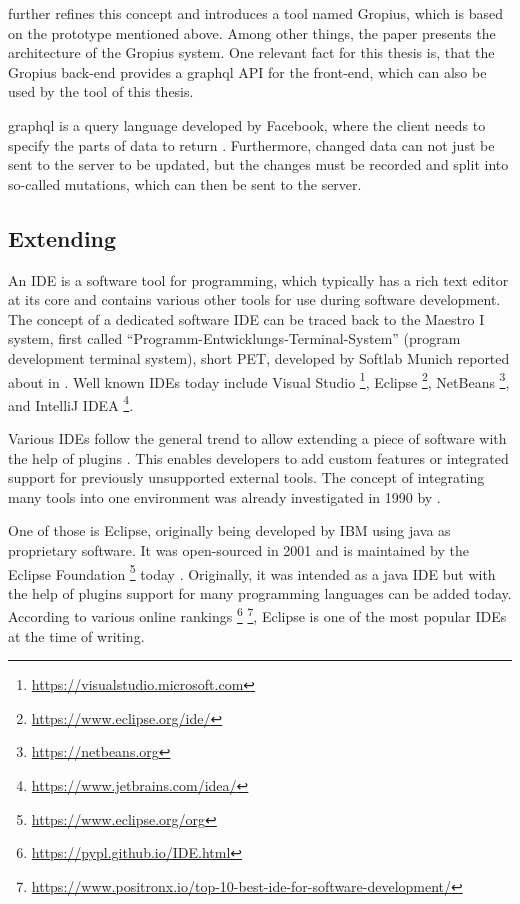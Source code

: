 \cite{speth2020gropius} further refines this concept and introduces a tool named \gls{Gropius}, which is  based on the prototype mentioned above.
Among other things, the paper presents the architecture of the \gls{Gropius} system. 
One relevant fact for this thesis is, that the \gls{Gropius} back-end provides a \gls{graphql} \gls{API} for the front-end,
which can also be used by the tool of this thesis.

\gls{graphql} is a query language developed by Facebook, where the client needs to specify the parts of data to return \cite{grpahql2018}.
Furthermore, changed data can not just be sent to the server to be updated, but the changes must be recorded and split into so-called mutations,
which can then be sent to the server.

\subsection{Extending }
\label{ssec:ch2:ss1.3}
An \gls{IDE} is a software tool for programming, which typically has a rich text editor at its core 
and contains various other tools for use during software development.
The concept of a dedicated software \gls{IDE} can be traced back to the Maestro I system, first called ``Programm-Entwicklungs-Terminal-System'' (program development terminal system), short PET, developed by Softlab Munich reported about in \cite{Computerwoche1975Ide}.
Well known \glspl{IDE} today include Visual Studio \footnote{\url{https://visualstudio.microsoft.com}}, \gls{Eclipse} \footnote{\url{https://www.eclipse.org/ide/}}, NetBeans \footnote{\url{https://netbeans.org}}, and IntelliJ IDEA \footnote{\url{https://www.jetbrains.com/idea/}}.

Various \glspl{IDE} follow the general trend to allow extending a piece of software with the help of plugins \cite{chang2008issues}.
This enables developers to add custom features or integrated support for previously unsupported external tools.
The concept of integrating many tools into one environment was already investigated in 1990 by \cite{wasserman1990tool}.

One of those is \gls{Eclipse}, originally being developed by IBM using \gls{java} as proprietary software.
It was open-sourced in 2001 and is maintained by the Eclipse Foundation 
\footnote{\url{https://www.eclipse.org/org}} today \cite{burnette2005eclipse}.
Originally, it was intended as a \gls{java} \gls{IDE} but with the help of plugins support for many programming languages can be added today.
According to various online rankings \footnote{\url{https://pypl.github.io/IDE.html}}
\footnote{\url{https://www.positronx.io/top-10-best-ide-for-software-development/}},
\gls{Eclipse} is one of the most popular \glspl{IDE} at the time of writing.

